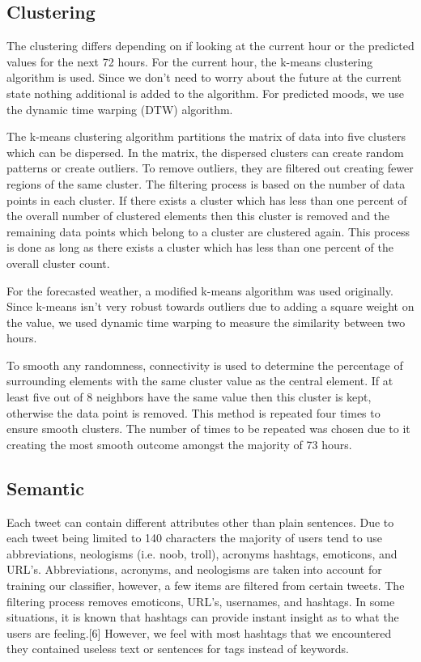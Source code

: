 \documentclass[journal]{vgtc}                %
\begin{document}
\subsection{Clustering}
The clustering differs depending on if looking at the current hour or the predicted values for the next 72 hours. For the current hour, the k-means clustering algorithm is used. Since we don't need to worry about the future at the current state nothing additional is added to the algorithm. For predicted moods, we use the  dynamic time warping (DTW) algorithm.

The k-means clustering algorithm partitions the matrix of data into five clusters which can be dispersed. In the matrix, the dispersed clusters can create random patterns or create outliers. To remove outliers, they are filtered out creating fewer regions of the same cluster. The filtering process is based on the number of data points in each cluster. If there exists a cluster which has less than one percent of the overall number of clustered elements then this cluster is removed and the remaining data points which belong to a cluster are clustered again. This process is done as long as there exists a cluster which has less than one percent of the overall cluster count. 

For the forecasted weather, a modified k-means algorithm was used originally. Since k-means isn't very robust towards outliers due to adding a square weight on the value, we used dynamic time warping to measure the similarity between two hours. 

To smooth any randomness, connectivity is used to determine the percentage of surrounding elements with the same cluster value as the central element. If at least five out of 8 neighbors have the same value then this cluster is kept, otherwise the data point is removed. This method is repeated four times to ensure smooth clusters. The number of times to be repeated was chosen due to it creating the most smooth outcome amongst the majority of 73 hours.

\subsection{Semantic}

Each tweet can contain different attributes other than plain sentences. Due to each tweet being limited to 140 characters the majority of users tend to use abbreviations, neologisms (i.e. noob, troll), acronyms hashtags, emoticons, and URL's. Abbreviations, acronyms, and neologisms are taken into account for training our classifier, however, a few items are filtered from certain tweets. The filtering process removes  emoticons, URL's, usernames, and hashtags. In some situations, it is known that hashtags can provide instant insight as to what the users are feeling.[6] However, we feel with most hashtags that we encountered they contained useless text or sentences for tags instead of keywords.
\end{document}
